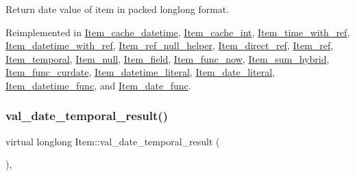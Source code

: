 Return date value of item in packed longlong format. 

Reimplemented in \mbox{\hyperlink{classItem__cache__datetime_ab2431102a1d70199b6d9438c12ac3b24}{Item\+\_\+cache\+\_\+datetime}}, \mbox{\hyperlink{classItem__cache__int_afea06afa547e7884db25240f67cfff0d}{Item\+\_\+cache\+\_\+int}}, \mbox{\hyperlink{classItem__time__with__ref_a1137ceb3bed39b0ff416f5534bd5b18d}{Item\+\_\+time\+\_\+with\+\_\+ref}}, \mbox{\hyperlink{classItem__datetime__with__ref_acc643536450eae3ce88e244d70b8e3e5}{Item\+\_\+datetime\+\_\+with\+\_\+ref}}, \mbox{\hyperlink{classItem__ref__null__helper_ae8e303c9b0015a81a80607ff31cdf57e}{Item\+\_\+ref\+\_\+null\+\_\+helper}}, \mbox{\hyperlink{classItem__direct__ref_a10fdb82072009fd9bc88657cbc49f282}{Item\+\_\+direct\+\_\+ref}}, \mbox{\hyperlink{classItem__ref_a749f7427b60d23f3f50a6651dcc3abf6}{Item\+\_\+ref}}, \mbox{\hyperlink{classItem__temporal_a3af452477612ee734dbee3b4b206b14f}{Item\+\_\+temporal}}, \mbox{\hyperlink{classItem__null_a99590d9cddd9f8fbc0a6bfbc848325e9}{Item\+\_\+null}}, \mbox{\hyperlink{classItem__field_a29fb94776a9681e8d166112f4ab2fb97}{Item\+\_\+field}}, \mbox{\hyperlink{classItem__func__now_a0abcdd4d578abeacaa50a754563cbd9f}{Item\+\_\+func\+\_\+now}}, \mbox{\hyperlink{classItem__sum__hybrid_a33ba0c96d045283cd6ddcf3fcf4ec992}{Item\+\_\+sum\+\_\+hybrid}}, \mbox{\hyperlink{classItem__func__curdate_aa8961163e017b6d68c26df334cd9c0b6}{Item\+\_\+func\+\_\+curdate}}, \mbox{\hyperlink{classItem__datetime__literal_af205497e535eba297fbdd01b60bb93d9}{Item\+\_\+datetime\+\_\+literal}}, \mbox{\hyperlink{classItem__date__literal_a03ebcf3ba975b9b8605edad6e902b2db}{Item\+\_\+date\+\_\+literal}}, \mbox{\hyperlink{classItem__datetime__func_a10b03b1938f6aa1c40e1191fe304f943}{Item\+\_\+datetime\+\_\+func}}, and \mbox{\hyperlink{classItem__date__func_a34f95de47fe9ff5bfe16fb641ec22a42}{Item\+\_\+date\+\_\+func}}.

\mbox{\label{classItem_aa66204e63dc471de5be79e2da81ac7aa}} 
\subsubsection{\texorpdfstring{val\+\_\+date\+\_\+temporal\+\_\+result()}{val\_date\_temporal\_result()}}
{\footnotesize\ttfamily virtual longlong Item\+::val\+\_\+date\+\_\+temporal\+\_\+result (\begin{DoxyParamCaption}{ }\end{DoxyParamCaption})\hspace{0.3cm}{\ttfamily [inline]}, {\ttfamily [virtual]}}

